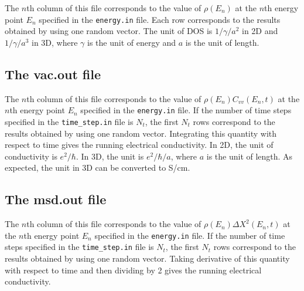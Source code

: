 \documentclass[12pt,a4paper]{report}
\begin{document}
The $n$th column of this file corresponds to the value of $\rho(E_n)$ at the $n$th energy point $E_n$ specified in the \verb"energy.in" file. Each row corresponds to the results obtained by using one random vector. The unit of DOS is $1/\gamma/a^2$ in 2D and $1/\gamma/a^3$ in 3D, where $\gamma$ is the unit of energy and $a$ is the unit of length.


\subsection{The vac.out file}

The $n$th column of this file corresponds to the value of $\rho(E_n)C_{vv}(E_n,t)$ at the $n$th energy point $E_n$ specified in the \verb"energy.in" file. If the number of time steps specified in the \verb"time_step.in" file is $N_t$, the first $N_t$ rows correspond to the results obtained by using one random vector. Integrating this quantity with respect to time gives the running electrical conductivity. In 2D, the unit of conductivity is $e^2/\hbar$. In 3D, the unit is $e^2/\hbar/a$, where $a$ is the unit of length. As expected, the unit in 3D can be converted to S/cm.

\subsection{The msd.out file}

The $n$th column of this file corresponds to the value of $\rho(E_n) \Delta X^2(E_n,t)$ at the $n$th energy point $E_n$ specified in the \verb"energy.in" file. If the number of time steps specified in the \verb"time_step.in" file is $N_t$, the first $N_t$ rows correspond to the results obtained by using one random vector. Taking derivative of this quantity with respect to time and then dividing by 2 gives the running electrical conductivity. 









\end{document}
